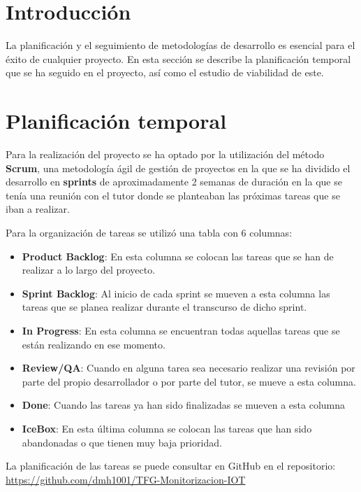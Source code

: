 
\section{Introducción}

La planificación y el seguimiento de metodologías de desarrollo es esencial para el éxito de cualquier proyecto. En esta sección se describe la planificación temporal que se ha seguido en el proyecto, así como el estudio de viabilidad de este.

\section{Planificación temporal}

Para la realización del proyecto se ha optado por la utilización del método \textbf{Scrum}, una metodología ágil de gestión de proyectos en la  que se ha dividido el desarrollo en \textbf{sprints} de aproximadamente 2 semanas de duración en la que se tenía una reunión con el tutor donde se planteaban las próximas tareas que se iban a realizar.

Para la organización de tareas se utilizó una tabla con 6 columnas:

\begin{itemize}
    \item \textbf{Product Backlog}: En esta columna se colocan las tareas que se han de realizar a lo largo del proyecto.
    \item \textbf{Sprint Backlog}: Al inicio de cada sprint se mueven a esta columna las tareas que se planea realizar durante el transcurso de dicho sprint.
    \item \textbf{In Progress}: En esta columna se encuentran todas aquellas tareas que se están realizando en ese momento.
    \item \textbf{Review/QA}: Cuando en alguna tarea sea necesario realizar una revisión por parte del propio desarrollador o por parte del tutor, se mueve a esta columna.
    \item \textbf{Done}: Cuando las tareas ya han sido finalizadas se mueven a esta columna
    \item \textbf{IceBox}: En esta última columna se colocan las tareas que han sido abandonadas o que tienen muy baja prioridad.
\end{itemize}


La planificación de las tareas se puede consultar en GitHub en el repositorio: \url{https://github.com/dmh1001/TFG-Monitorizacion-IOT}

